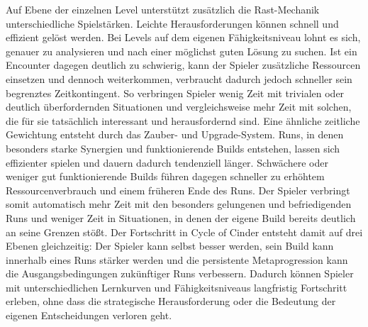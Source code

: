 Auf Ebene der einzelnen Level unterstützt zusätzlich die Rast-Mechanik unterschiedliche Spielstärken.
Leichte Herausforderungen können schnell und effizient gelöst werden.
Bei Levels auf dem eigenen Fähigkeitsniveau lohnt es sich, genauer zu analysieren und nach einer möglichst guten Lösung zu suchen.
Ist ein Encounter dagegen deutlich zu schwierig, kann der Spieler zusätzliche Ressourcen einsetzen und dennoch weiterkommen, verbraucht dadurch jedoch schneller sein begrenztes Zeitkontingent.
So verbringen Spieler wenig Zeit mit trivialen oder deutlich überfordernden Situationen und vergleichsweise mehr Zeit mit solchen, die für sie tatsächlich interessant und herausfordernd sind.
Eine ähnliche zeitliche Gewichtung entsteht durch das Zauber- und Upgrade-System.
Runs, in denen besonders starke Synergien und funktionierende Builds entstehen, lassen sich effizienter spielen und dauern dadurch tendenziell länger.
Schwächere oder weniger gut funktionierende Builds führen dagegen schneller zu erhöhtem Ressourcenverbrauch und einem früheren Ende des Runs.
Der Spieler verbringt somit automatisch mehr Zeit mit den besonders gelungenen und befriedigenden Runs und weniger Zeit in Situationen, in denen der eigene Build bereits deutlich an seine Grenzen stößt.
Der Fortschritt in Cycle of Cinder entsteht damit auf drei Ebenen gleichzeitig: Der Spieler kann selbst besser werden, sein Build kann innerhalb eines Runs stärker werden und die persistente Metaprogression kann die Ausgangsbedingungen zukünftiger Runs verbessern.
Dadurch können Spieler mit unterschiedlichen Lernkurven und Fähigkeitsniveaus langfristig Fortschritt erleben, ohne dass die strategische Herausforderung oder die Bedeutung der eigenen Entscheidungen verloren geht.
